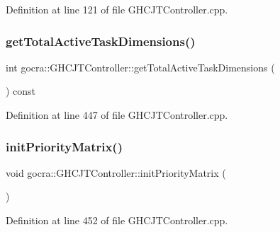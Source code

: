 Definition at line 121 of file G\+H\+C\+J\+T\+Controller.\+cpp.

\hypertarget{classgocra_1_1GHCJTController_a7089de05269c8d2ded61640d3ae485b1}{}\label{classgocra_1_1GHCJTController_a7089de05269c8d2ded61640d3ae485b1} 
\subsubsection{\texorpdfstring{get\+Total\+Active\+Task\+Dimensions()}{getTotalActiveTaskDimensions()}}
{\footnotesize\ttfamily int gocra\+::\+G\+H\+C\+J\+T\+Controller\+::get\+Total\+Active\+Task\+Dimensions (\begin{DoxyParamCaption}{ }\end{DoxyParamCaption}) const}



Definition at line 447 of file G\+H\+C\+J\+T\+Controller.\+cpp.

\hypertarget{classgocra_1_1GHCJTController_a259208518d68271b441369d1538fe362}{}\label{classgocra_1_1GHCJTController_a259208518d68271b441369d1538fe362} 
\subsubsection{\texorpdfstring{init\+Priority\+Matrix()}{initPriorityMatrix()}}
{\footnotesize\ttfamily void gocra\+::\+G\+H\+C\+J\+T\+Controller\+::init\+Priority\+Matrix (\begin{DoxyParamCaption}{ }\end{DoxyParamCaption})}



Definition at line 452 of file G\+H\+C\+J\+T\+Controller.\+cpp.

\hypertarget{classgocra_1_1GHCJTController_a1ca094d27af8fe35e4196647eb5aeb4e}{}\label{classgocra_1_1GHCJTController_a1ca094d27af8fe35e4196647eb5aeb4e} 

